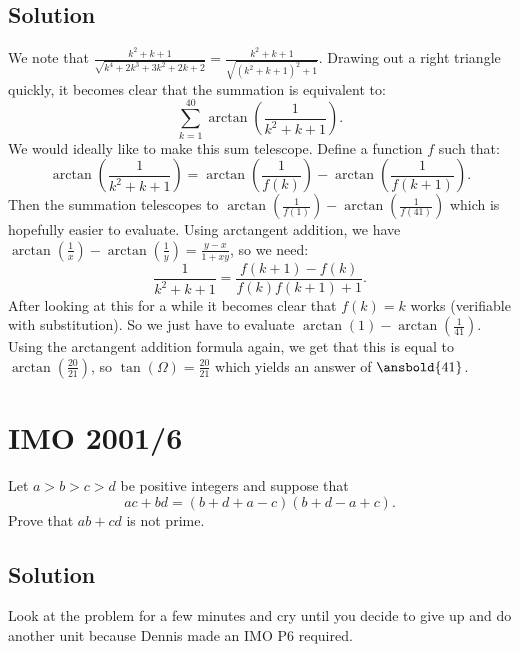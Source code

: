 \documentclass{article}
\begin{document}
\subsection{Solution}
We note that $\frac{k^2+k+1}{\sqrt{k^4+2k^3+3k^2+2k+2}}=\frac{k^2+k+1}{\sqrt{(k^2+k+1)^2+1}}$. Drawing out a right triangle quickly, it becomes clear that the summation is equivalent to:
$$\sum_{k=1}^{40} \arctan \left(\frac{1}{k^2+k+1} \right).$$
We would ideally like to make this sum telescope. Define a function $f$ such that:
$$\arctan \left(\frac{1}{k^2+k+1}\right)=\arctan \left(\frac{1}{f(k)}\right)-\arctan \left(\frac{1}{f(k+1)}\right).$$
Then the summation telescopes to $\arctan \left(\frac{1}{f(1)}\right)-\arctan \left(\frac{1}{f(41)}\right)$ which is hopefully easier to evaluate. Using arctangent addition, we have $\arctan \left(\frac{1}{x}\right)-\arctan \left(\frac{1}{y}\right)=\frac{y-x}{1+xy}$, so we need:
$$\frac{1}{k^2+k+1}=\frac{f(k+1)-f(k)}{f(k)f(k+1)+1}.$$
After looking at this for a while it becomes clear that $f(k)=k$ works (verifiable with substitution). So we just have to evaluate $\arctan(1)-\arctan \left(\frac{1}{41}\right)$. Using the arctangent addition formula again, we get that this is equal to $\arctan \left(\frac{20}{21}\right)$, so $\tan (\Omega)=\frac{20}{21}$ which yields an answer of $\ansbold{41}$.

\pagebreak\section{IMO 2001/6}
Let $a > b > c > d$ be positive integers and suppose that \[ ac + bd = (b+d+a-c)(b+d-a+c). \] Prove that $ab + cd$ is not prime.

\subsection{Solution}
Look at the problem for a few minutes and cry until you decide to give up and do another unit because Dennis made an IMO P6 required.
\end{document}
